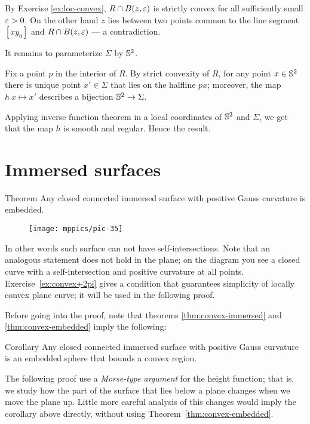 By Exercise \ref{ex:loc-convex}, $R\cap B(z,\varepsilon)$ is strictly convex for all sufficiently small $\varepsilon>0$.
On the other hand $z$ lies between two points common to the line segment $[xy_0]$ and $R\cap B(z,\varepsilon)$ --- a contradiction.

It remains to parameterize $\Sigma$ by $\mathbb{S}^2$.

Fix a point $p$ in the interior of $R$.
By strict convexity of $R$, for any point $x\in \mathbb{S}^2$ there is unique point $x'\in \Sigma$ that lies on the halfline $px$;
moreover, the map $h\:x\mapsto x'$ describes a bijection $\mathbb{S}^2\to \Sigma$.

Applying inverse function theorem in a local coordinates of $\mathbb{S}^2$ and $\Sigma$,
we get that the map $h$ is smooth and regular.
Hence the result.
\qeds

\section{Immersed surfaces}

\begin{thm}{Theorem}\label{thm:convex-immersed}
Any closed connected immersed surface with positive Gauss curvature is embedded.
\end{thm}



\begin{wrapfigure}{r}{20 mm}
\vskip-0mm
\centering
\texttt{[image: mppics/pic-35]}
\vskip-0mm
\end{wrapfigure}

In other words such surface can not have self-intersections.
Note that an analogous statement does not hold in the plane;
on the diagram you see a closed curve with a self-intersection and positive curvature at all points.
Exercise~\ref{ex:convex+2pi} gives a condition that guarantees simplicity of locally convex plane curve;
it will be used in the following proof.



Before going into the proof, note that theorems \ref{thm:convex-immersed} and \ref{thm:convex-embedded}
imply the following:

\begin{thm}{Corollary}
Any closed connected immersed surface with positive Gauss curvature is an embedded sphere that bounds a convex region.
\end{thm}

The following proof use a \emph{Morse-type argument} for the height function;
that is, we study how the part of the surface that lies below a plane changes when we move the plane up.
Little more careful analysis of this changes would imply the corollary above directly, without using Theorem~\ref{thm:convex-embedded}.

